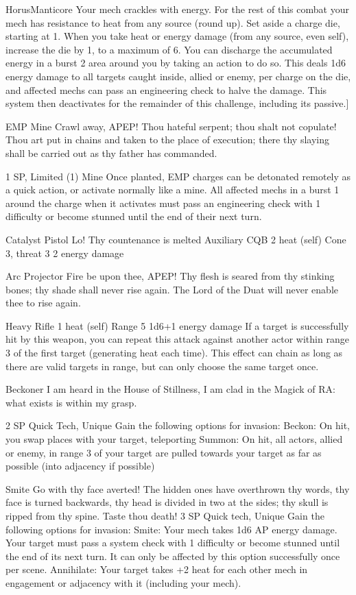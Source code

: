 \begin{mech}{Horus}{Manticore}
{Your mech crackles with energy. For the rest of this combat your mech has resistance to heat from any source (round up). Set aside a charge die, starting at 1. When you take heat or energy damage (from any source, even self), increase the die by 1, to a maximum of 6. You can discharge the accumulated energy in a burst 2 area around you by taking an action to do so. This deals 1d6 energy damage to all targets caught inside, allied or enemy, per charge on the die, and affected mechs can pass an engineering check to halve the damage. This system then deactivates for the remainder of this challenge, including its passive.}]


EMP Mine
Crawl away, APEP! Thou hateful serpent; thou shalt not copulate! Thou art put in chains and taken to the place of execution; there thy slaying shall be carried out as thy father has commanded.

1 SP, Limited (1)
Mine
Once planted, EMP charges can be detonated remotely as a quick action, or activate normally like a mine. All affected mechs in a burst 1 around the charge when it activates must pass an engineering check with 1 difficulty or become stunned until the end of their next turn.

Catalyst Pistol
Lo! Thy countenance is melted
Auxiliary CQB
2 heat (self)
Cone 3, threat 3
2 energy damage

Arc Projector
Fire be upon thee, APEP! Thy flesh is seared from thy stinking bones; thy shade shall never rise again. The Lord of the Duat will never enable thee to rise again.

Heavy Rifle
1 heat (self)
Range 5
1d6+1 energy damage
If a target is successfully hit by this weapon, you can repeat this attack against another actor within range 3 of the first target (generating heat each time). This effect can chain as long as there are valid targets in range, but can only choose the same target once.

Beckoner
I am heard in the House of Stillness, I am clad in the Magick of RA: what exists is within my grasp.

2 SP
Quick Tech, Unique
Gain the following options for invasion:
Beckon: On hit, you swap places with your target, teleporting
Summon: On hit, all actors, allied or enemy, in range 3 of your target are pulled towards your target as far as possible (into adjacency if possible)

Smite
Go with thy face averted! The hidden ones have overthrown thy words, thy face is turned backwards, thy head is divided in two at the sides; thy skull is ripped from thy spine. Taste thou death!
3 SP
Quick tech, Unique
Gain the following options for invasion:
	Smite: Your mech takes 1d6 AP energy damage. Your target must pass a system check with 1 difficulty or become stunned until the end of its next turn. It can only be affected by this option successfully once per scene.
Annihilate: Your target takes +2 heat for each other mech in engagement or adjacency with it (including your mech).


\end{mech}
